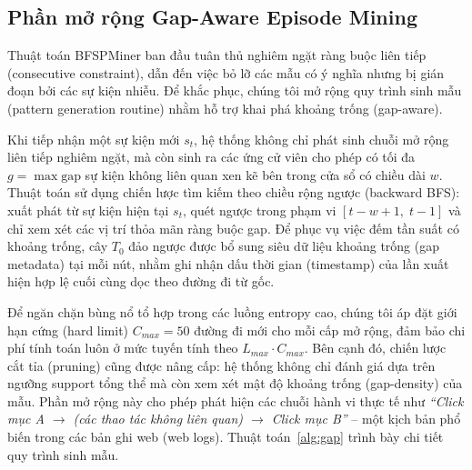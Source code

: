 \documentclass[conference]{IEEEtran}
\begin{document}
\subsection{Phần mở rộng Gap-Aware Episode Mining}
Thuật toán BFSPMiner ban đầu tuân thủ nghiêm ngặt ràng buộc liên tiếp (consecutive constraint), dẫn đến việc bỏ lỡ các mẫu có ý nghĩa nhưng bị gián đoạn bởi các sự kiện nhiễu. Để khắc phục, chúng tôi mở rộng quy trình sinh mẫu (pattern generation routine) nhằm hỗ trợ khai phá khoảng trống (gap-aware). 

Khi tiếp nhận một sự kiện mới $s_t$, hệ thống không chỉ phát sinh chuỗi mở rộng liên tiếp nghiêm ngặt, mà còn sinh ra các ứng cử viên cho phép có tối đa $g = \max\text{gap}$ sự kiện không liên quan xen kẽ bên trong cửa sổ có chiều dài $w$. Thuật toán sử dụng chiến lược tìm kiếm theo chiều rộng ngược (backward BFS): xuất phát từ sự kiện hiện tại $s_t$, quét ngược trong phạm vi $[t - w + 1,\; t - 1]$ và chỉ xem xét các vị trí thỏa mãn ràng buộc gap. Để phục vụ việc đếm tần suất có khoảng trống, cây $T_0$ đảo ngược được bổ sung siêu dữ liệu khoảng trống (gap metadata) tại mỗi nút, nhằm ghi nhận dấu thời gian (timestamp) của lần xuất hiện hợp lệ cuối cùng dọc theo đường đi từ gốc.

Để ngăn chặn bùng nổ tổ hợp trong các luồng entropy cao, chúng tôi áp đặt giới hạn cứng (hard limit) $C_{max} = 50$ đường đi mới cho mỗi cấp mở rộng, đảm bảo chi phí tính toán luôn ở mức tuyến tính theo $L_{max} \cdot C_{max}$. Bên cạnh đó, chiến lược cắt tỉa (pruning) cũng được nâng cấp: hệ thống không chỉ đánh giá dựa trên ngưỡng support tổng thể mà còn xem xét mật độ khoảng trống (gap-density) của mẫu. Phần mở rộng này cho phép phát hiện các chuỗi hành vi thực tế như \textit{``Click mục A $\rightarrow$ (các thao tác không liên quan) $\rightarrow$ Click mục B''} -- một kịch bản phổ biến trong các bản ghi web (web logs). Thuật toán~\ref{alg:gap} trình bày chi tiết quy trình sinh mẫu.
\end{document}
